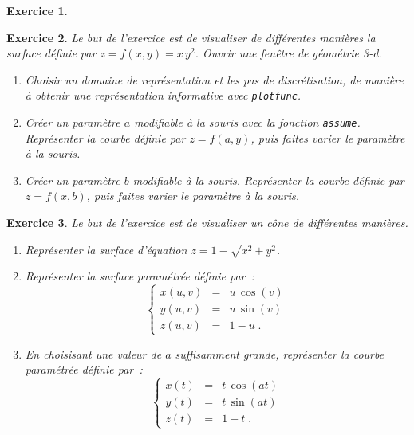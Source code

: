 \documentclass{article}
\newtheorem{exo}{Exercice}[section]
\begin{document}
\begin{giacjshere}
\begin{exo}
{\begin{enumerate}
\end{enumerate} 
}\end{exo}
\begin{exo}{\rm
Le but de l'exercice est de visualiser de diff\'erentes mani\`eres
la surface d\'efinie  par $z=f(x,y)=x\,y^2$. Ouvrir une fen\^etre
de g\'eom\'etrie 3-d.
\begin{enumerate}
\item
Choisir un domaine de repr\'esentation et les pas de discr\'etisation,
de mani\`ere \`a obtenir une repr\'esentation informative
avec \verb+plotfunc+. 
\item
Cr\'eer un param\`etre $a$ modifiable \`a la souris
avec la fonction \verb|assume|.
Repr\'esenter la courbe d\'efinie par $z=f(a,y)$, puis faites
varier le param\`etre \`a la souris.
\item
Cr\'eer un param\`etre $b$ modifiable \`a la souris.
Repr\'esenter la courbe d\'efinie par $z=f(x,b)$, puis faites
varier le param\`etre \`a la souris.
\end{enumerate} 
}\end{exo}
\begin{exo}{\rm
Le but de l'exercice est de visualiser un c\^one de diff\'erentes
mani\`eres.
\begin{enumerate}
\item
Repr\'esenter la surface d'\'equation $z=1-\sqrt{x^2+y^2}$.
\item
Repr\'esenter la surface param\'etr\'ee d\'efinie par~:
$$
\left\{
\begin{array}{lcl}
x(u,v)&=& u\,\cos(v)\\
y(u,v)&=& u\,\sin(v)\\
z(u,v)&=& 1-u\;.
\end{array}
\right.
$$
\item
En choisisant une valeur de $a$ suffisamment grande, repr\'esenter la courbe 
param\'etr\'ee d\'efinie par~: 
$$
\left\{
\begin{array}{lcl}
x(t)&=& t\,\cos(a t)\\
y(t)&=& t\,\sin(a t)\\
z(t)&=& 1-t\;.
\end{array}
\right.
$$


\end{enumerate}}
\end{exo}
\end{giacjshere}
\end{document}
